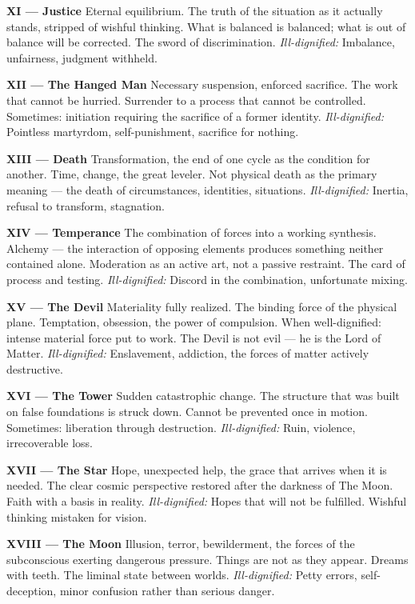 \textbf{XI --- Justice} Eternal equilibrium. The truth of the situation as it actually stands, stripped of wishful thinking. What is balanced is balanced; what is out of balance will be corrected. The sword of discrimination. \emph{Ill-dignified:} Imbalance, unfairness, judgment withheld.

\textbf{XII --- The Hanged Man} Necessary suspension, enforced sacrifice. The work that cannot be hurried. Surrender to a process that cannot be controlled. Sometimes: initiation requiring the sacrifice of a former identity. \emph{Ill-dignified:} Pointless martyrdom, self-punishment, sacrifice for nothing.

\textbf{XIII --- Death} Transformation, the end of one cycle as the condition for another. Time, change, the great leveler. Not physical death as the primary meaning --- the death of circumstances, identities, situations. \emph{Ill-dignified:} Inertia, refusal to transform, stagnation.

\textbf{XIV --- Temperance} The combination of forces into a working synthesis. Alchemy --- the interaction of opposing elements produces something neither contained alone. Moderation as an active art, not a passive restraint. The card of process and testing. \emph{Ill-dignified:} Discord in the combination, unfortunate mixing.

\textbf{XV --- The Devil} Materiality fully realized. The binding force of the physical plane. Temptation, obsession, the power of compulsion. When well-dignified: intense material force put to work. The Devil is not evil --- he is the Lord of Matter. \emph{Ill-dignified:} Enslavement, addiction, the forces of matter actively destructive.

\textbf{XVI --- The Tower} Sudden catastrophic change. The structure that was built on false foundations is struck down. Cannot be prevented once in motion. Sometimes: liberation through destruction. \emph{Ill-dignified:} Ruin, violence, irrecoverable loss.

\textbf{XVII --- The Star} Hope, unexpected help, the grace that arrives when it is needed. The clear cosmic perspective restored after the darkness of The Moon. Faith with a basis in reality. \emph{Ill-dignified:} Hopes that will not be fulfilled. Wishful thinking mistaken for vision.

\textbf{XVIII --- The Moon} Illusion, terror, bewilderment, the forces of the subconscious exerting dangerous pressure. Things are not as they appear. Dreams with teeth. The liminal state between worlds. \emph{Ill-dignified:} Petty errors, self-deception, minor confusion rather than serious danger.

